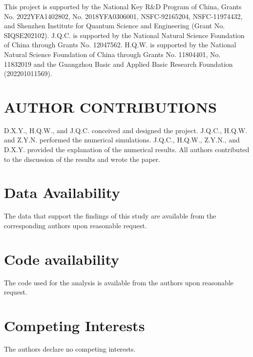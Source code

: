 \documentclass[aps,prx,showpacs,floatfix,twocolumn,superscriptaddress,nofootinbib,longbibliography]{revtex4-2}
\begin{document}
\begin{acknowledgments}
This project is supported by the National Key R$\&$D Program of China, Grants No. 2022YFA1402802, No. 2018YFA0306001, NSFC-92165204, NSFC-11974432, and Shenzhen Institute for Quantum Science and Engineering (Grant No. SIQSE202102). J.Q.C. is supported by the National Natural Science Foundation of China through Grants No. 12047562.  H.Q.W. is supported by the National Natural Science Foundation of China through Grants No. 11804401, No. 11832019 and the Guangzhou Basic and Applied Basic Research Foundation (202201011569). 
\end{acknowledgments}

\section{ AUTHOR CONTRIBUTIONS}
 D.X.Y., H.Q.W., and J.Q.C. conceived and designed the project. J.Q.C., H.Q.W. and Z.Y.N. performed the numerical simulations.  J.Q.C., H.Q.W., Z.Y.N., and D.X.Y. provided the explanation of the numerical results. All authors contributed to the discussion of the results and wrote the paper.

\section{ Data Availability}
The data that support the findings of this study are available from the corresponding authors upon reasonable request.


\section{Code availability}
The code used for the analysis is available from the authors upon reasonable request.


\section{ Competing Interests}
The authors declare no competing interests.










\end{document}
